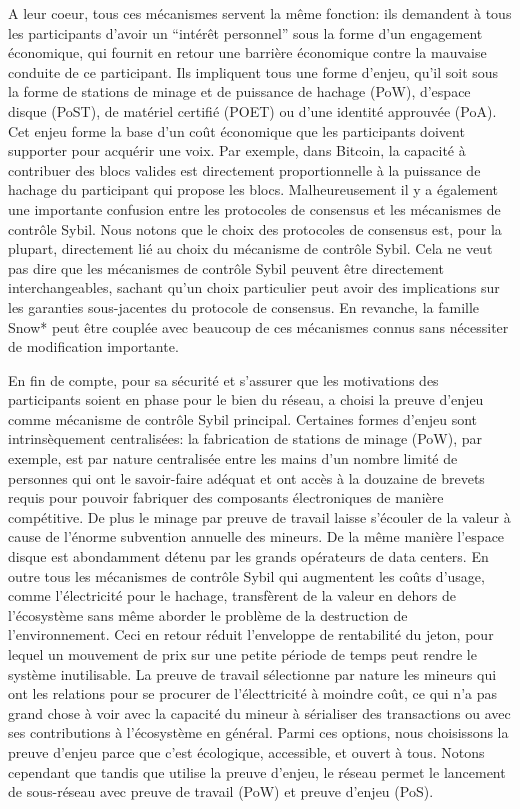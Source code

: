 \documentclass[runningheads]{llncs}
\begin{document}
A leur coeur, tous ces mécanismes servent la même fonction: ils demandent à tous les participants d'avoir un ``intérêt
personnel''  sous la forme d'un engagement économique, qui fournit en retour une barrière économique contre la mauvaise
conduite de ce participant. Ils impliquent tous une forme d'enjeu, qu'il soit sous la forme de stations de minage et de
puissance de hachage (PoW), d'espace disque (PoST), de matériel certifié (POET) ou d'une identité approuvée (PoA). Cet
enjeu forme la base d'un coût économique que les participants doivent supporter pour acquérir une voix. Par exemple,
dans Bitcoin, la capacité à contribuer des blocs valides est directement proportionnelle à la puissance de hachage du
participant qui propose les blocs. Malheureusement il y a également une importante confusion entre les protocoles de
consensus et les mécanismes de contrôle Sybil. Nous notons que le choix des protocoles de consensus est, pour la
plupart, directement lié au choix du mécanisme de contrôle Sybil. Cela ne veut pas dire que les mécanismes de contrôle
Sybil peuvent être directement interchangeables, sachant qu'un choix particulier peut avoir des implications sur les
garanties sous-jacentes du protocole de consensus. En revanche, la famille Snow* peut être couplée avec beaucoup de ces
mécanismes connus sans nécessiter de modification importante.

En fin de compte, pour sa sécurité et s'assurer que les motivations des participants soient en phase pour le bien du
réseau, \AVATokenName{} a choisi la preuve d'enjeu comme mécanisme de contrôle Sybil principal. Certaines formes
d'enjeu sont intrinsèquement centralisées: la fabrication de stations de minage (PoW), par exemple, est par nature
centralisée entre les mains d'un nombre limité de personnes qui ont le savoir-faire adéquat et ont accès à la douzaine
de brevets requis pour pouvoir fabriquer des composants électroniques de manière compétitive. De plus le minage par
preuve de travail laisse s'écouler de la valeur à cause de l'énorme subvention annuelle des mineurs. De la même manière
l'espace disque est abondamment détenu par les grands opérateurs de data centers. En outre tous les mécanismes de
contrôle Sybil qui augmentent les coûts d'usage, comme l'électricité pour le hachage, transfèrent de la valeur en dehors
de l'écosystème sans même aborder le problème de la destruction de l'environnement. Ceci en retour réduit l'enveloppe de
rentabilité du jeton, pour lequel un mouvement de prix sur une petite période de temps peut rendre le système
inutilisable. La preuve de travail sélectionne par nature les mineurs qui ont les relations pour se procurer de
l'électtricité à moindre coût, ce qui n'a pas grand chose à voir avec la capacité du mineur à sérialiser des
transactions ou avec ses contributions à l'écosystème en général. Parmi ces options, nous choisissons la preuve d'enjeu
parce que c'est écologique, accessible, et ouvert à tous. Notons cependant que tandis que \AVATokenName{} utilise la
preuve d'enjeu, le réseau \AVAPlatformName{} permet le lancement de sous-réseau avec preuve de travail (PoW) et preuve
d'enjeu (PoS).
\end{document}
